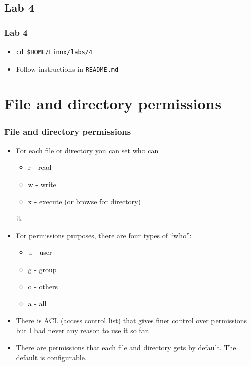 \documentclass{beamer}
\begin{document}
\subsection{Lab 4}
\begin{frame}[fragile]
  \frametitle{Lab 4}
\begin{itemize}
\item
{\color{mycolorcli}
\begin{verbatim}
cd $HOME/Linux/labs/4
\end{verbatim}
}
\item Follow instructions in {\color{mycolorcli}\verb|README.md|}
\end{itemize}

\end{frame}


\section{File and directory permissions}
\begin{frame}[fragile]
  \frametitle{File and directory permissions}
  \begin{itemize}
    \item For each file or directory you can set who can 
      \begin{itemize}
      \item {\color{mycolordef}r} - read
      \item {\color{mycolordef}w} - write
      \item {\color{mycolordef}x} - execute (or browse for directory)
      \end{itemize}
      it.
    \item For permissions purposes, there are four types of ``who'':
      \begin{itemize}
      \item {\color{mycolordef}u} - user
      \item {\color{mycolordef}g} - group
      \item {\color{mycolordef}o} - others
      \item {\color{mycolordef}a} - all
      \end{itemize}
    \item There is ACL (access control list) that gives finer control over permissions but I had never any reason to use it so far.
    \item There are permissions that each file and directory gets by default. The default is configurable.
  \end{itemize}
\end{frame}
\end{document}
